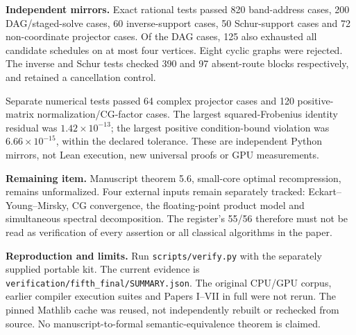 \documentclass[11pt]{article}
\newcommand{\code}[1]{\texttt{\small #1}}
\begin{document}
\textbf{Independent mirrors.} Exact rational tests passed 820 band-address cases, 200 DAG/staged-solve cases, 60 inverse-support cases, 50 Schur-support cases and 72 non-coordinate projector cases. Of the DAG cases, 125 also exhausted all candidate schedules on at most four vertices. Eight cyclic graphs were rejected. The inverse and Schur tests checked 390 and 97 absent-route blocks respectively, and retained a cancellation control.

Separate numerical tests passed 64 complex projector cases and 120 positive-matrix normalization/CG-factor cases. The largest squared-Frobenius identity residual was $1.42\times10^{-13}$; the largest positive condition-bound violation was $6.66\times10^{-15}$, within the declared tolerance. These are independent Python mirrors, not Lean execution, new universal proofs or GPU measurements.

\textbf{Remaining item.} Manuscript theorem 5.6, small-core optimal recompression, remains unformalized. Four external inputs remain separately tracked: Eckart--Young--Mirsky, CG convergence, the floating-point product model and simultaneous spectral decomposition. The register's 55/56 therefore must not be read as verification of every assertion or all classical algorithms in the paper.

\textbf{Reproduction and limits.} Run \code{scripts/verify.py} with the separately supplied portable kit. The current evidence is \code{verification/fifth\_final/SUMMARY.json}. The original CPU/GPU corpus, earlier compiler execution suites and Papers I--VII in full were not rerun. The pinned Mathlib cache was reused, not independently rebuilt or rechecked from source. No manuscript-to-formal semantic-equivalence theorem is claimed.
\end{document}
